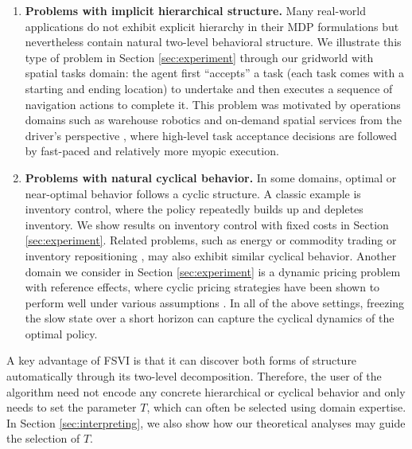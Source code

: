 \documentclass[11pt, notitlepage]{article}
\newcommand{\1}{\mathbbm{1}}
\begin{document}
\begin{enumerate}
    \item \textbf{Problems with implicit hierarchical structure.}
Many real-world applications do not exhibit explicit hierarchy in their MDP formulations but nevertheless contain natural two-level behavioral structure. We illustrate this type of problem in Section \ref{sec:experiment} through our gridworld with spatial tasks domain: the agent first ``accepts'' a task (each task comes with a starting and ending location) to undertake and then executes a sequence of navigation actions to complete it. This problem was motivated by operations domains such as warehouse robotics \citep{yang2020novel} and on-demand spatial services from the driver's perspective \citep{chung2018bike,jiang2020optimistic,ong2021driver,ashkrof2024relocation}, where high-level task acceptance decisions are followed by fast-paced and relatively more myopic execution.
\item \textbf{Problems with natural cyclical behavior.} In some domains, optimal or near-optimal behavior follows a cyclic structure. A classic example is inventory control, where the policy repeatedly builds up and depletes inventory. We show results on inventory control with fixed costs in Section \ref{sec:experiment}. Related problems, such as energy or commodity trading \citep{kim2011optimal,carmona2010valuation,lohndorf2010optimal,jiang2015optimal} or inventory repositioning \citep{he2020robust,benjaafar2022dynamic}, may also exhibit similar cyclical behavior. Another domain we consider in Section \ref{sec:experiment} is a dynamic pricing problem with reference effects, where cyclic pricing strategies have been shown to perform well under various assumptions \citep{wang2016intertemporal,chen2017efficient}. In all of the above settings, freezing the slow state over a short horizon can capture the cyclical dynamics of the optimal policy.
\end{enumerate}
A key advantage of FSVI is that it can discover both forms of structure automatically through its two-level decomposition. Therefore, the user of the algorithm need not encode any concrete hierarchical or cyclical behavior and only needs to set the parameter $T$, which can often be selected using domain expertise. In Section \ref{sec:interpreting}, we also show how our theoretical analyses may guide the selection of $T$.
\end{document}
